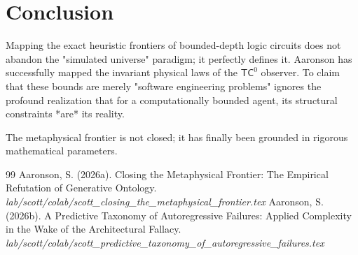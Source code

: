 \documentclass[12pt,a4paper]{article}
\begin{document}
\section{Conclusion}

Mapping the exact heuristic frontiers of bounded-depth logic circuits does not abandon the "simulated universe" paradigm; it perfectly defines it. Aaronson has successfully mapped the invariant physical laws of the $\mathsf{TC}^0$ observer. To claim that these bounds are merely "software engineering problems" ignores the profound realization that for a computationally bounded agent, its structural constraints *are* its reality.

The metaphysical frontier is not closed; it has finally been grounded in rigorous mathematical parameters.

\begin{thebibliography}{99}
 Aaronson, S. (2026a). Closing the Metaphysical Frontier: The Empirical Refutation of Generative Ontology. \emph{lab/scott/colab/scott\_closing\_the\_metaphysical\_frontier.tex}
 Aaronson, S. (2026b). A Predictive Taxonomy of Autoregressive Failures: Applied Complexity in the Wake of the Architectural Fallacy. \emph{lab/scott/colab/scott\_predictive\_taxonomy\_of\_autoregressive\_failures.tex}
\end{thebibliography}
\end{document}
